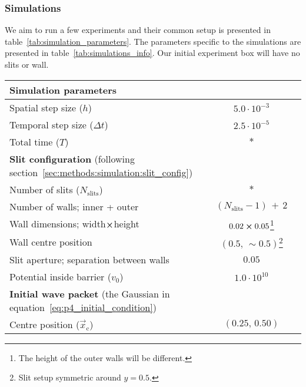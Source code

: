     \subsubsection{Simulations}\label{sec:methods:simulation:simulations}

        We aim to run a few experiments and their common setup is presented in table~\ref{tab:simulation_parameters}. The parameters specific to the simulations are presented in table~\ref{tab:simulations_info}. Our initial experiment box will have no slits or wall.

        \begin{table}[ht!]
            \centering
            \begin{tabular}{l|c}
                \hline
                \multicolumn{2}{l}{\textbf{Simulation parameters}} \\
                \hline
                Spatial step size ($h$)         & $5.0 \cdot 10^{-3}$   \\
                Temporal step size ($\Delta t$) & $2.5 \cdot 10^{-5}$   \\
                Total time ($T$)                & $*$                   \\
                \hline
                \multicolumn{2}{l}{\textbf{Slit configuration} (following section~\ref{sec:methods:simulation:slit_config})} \\
                \hline
                Number of slits ($N_\mathrm{slits}$)    & $*$                           \\
                Number of walls; inner + outer          & $(N_\mathrm{slits}-1) \, + \, 2$\\
                Wall dimensions; width$\cross$height    & $0.02\cross 0.05$\footnote{The height of the outer walls will be different.} \\
                Wall centre position                    & $(0.5,\, \sim\!0.5)$\footnote{Slit setup symmetric around $y=0.5$.}   \\
                Slit aperture; separation between walls & $0.05$                        \\
                Potential inside barrier ($v_0$)        & $1.0\cdot 10^{10}$            \\
                \hline
                \multicolumn{2}{l}{\textbf{Initial wave packet} (the Gaussian in equation~\eqref{eq:p4_initial_condition})} \\
                \hline
                Centre position ($\vec{x}_\mathrm{c}$)  & $(0.25,\,0.50)$           \\

\end{tabular}
\end{table}
